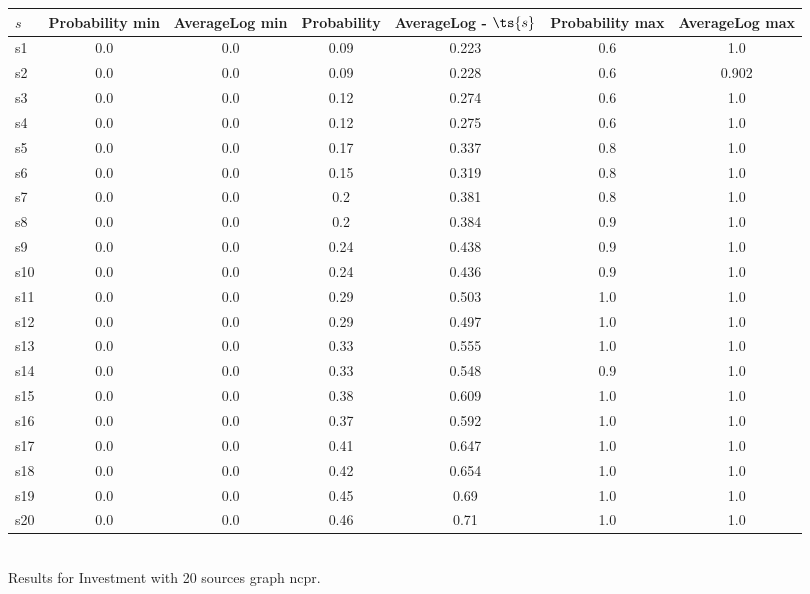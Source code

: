\documentclass{article}
\begin{document}
\noindent\begin{tabular}{|l|c|c|c|c|c|c|}
\hline
$s$& Probability min & AverageLog min & Probability & AverageLog - $\ts{s}$ & Probability max & AverageLog max\\
\hline
s1 &0.0 & 0.0 & 0.09 & 0.223 & 0.6 & 1.0\\
\hline
s2 &0.0 & 0.0 & 0.09 & 0.228 & 0.6 & 0.902\\
\hline
s3 &0.0 & 0.0 & 0.12 & 0.274 & 0.6 & 1.0\\
\hline
s4 &0.0 & 0.0 & 0.12 & 0.275 & 0.6 & 1.0\\
\hline
s5 &0.0 & 0.0 & 0.17 & 0.337 & 0.8 & 1.0\\
\hline
s6 &0.0 & 0.0 & 0.15 & 0.319 & 0.8 & 1.0\\
\hline
s7 &0.0 & 0.0 & 0.2 & 0.381 & 0.8 & 1.0\\
\hline
s8 &0.0 & 0.0 & 0.2 & 0.384 & 0.9 & 1.0\\
\hline
s9 &0.0 & 0.0 & 0.24 & 0.438 & 0.9 & 1.0\\
\hline
s10 &0.0 & 0.0 & 0.24 & 0.436 & 0.9 & 1.0\\
\hline
s11 &0.0 & 0.0 & 0.29 & 0.503 & 1.0 & 1.0\\
\hline
s12 &0.0 & 0.0 & 0.29 & 0.497 & 1.0 & 1.0\\
\hline
s13 &0.0 & 0.0 & 0.33 & 0.555 & 1.0 & 1.0\\
\hline
s14 &0.0 & 0.0 & 0.33 & 0.548 & 0.9 & 1.0\\
\hline
s15 &0.0 & 0.0 & 0.38 & 0.609 & 1.0 & 1.0\\
\hline
s16 &0.0 & 0.0 & 0.37 & 0.592 & 1.0 & 1.0\\
\hline
s17 &0.0 & 0.0 & 0.41 & 0.647 & 1.0 & 1.0\\
\hline
s18 &0.0 & 0.0 & 0.42 & 0.654 & 1.0 & 1.0\\
\hline
s19 &0.0 & 0.0 & 0.45 & 0.69 & 1.0 & 1.0\\
\hline
s20 &0.0 & 0.0 & 0.46 & 0.71 & 1.0 & 1.0\\
\hline
\end{tabular}\\

\noindent Results for Investment with 20 sources graph ncpr.
\end{document}
